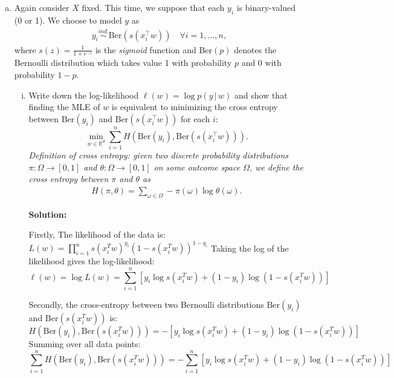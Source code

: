 \documentclass{article}
\newenvironment{solution}{\color{blue} \smallskip \textbf{Solution:}}{}
\begin{document}
\begin{enumerate}[(a)]
\begin{solution}
Thus, the MLE of \( \theta = (\theta_1, \dots, \theta_K) \) is:
\[
\boxed{\theta_k^* = \frac{n_k}{n}}
\]

 
    \end{solution}

    \newpage
    \item %
    Again consider $X$ fixed. This time, we suppose that each $y_i$ is binary-valued (0 or 1). We choose to model $y$ as 
    \begin{align*}
        y_i \stackrel{ind.}{\sim} \mathrm{Ber}(s(x_i^\top w))\quad \forall i=1,\ldots, n,
    \end{align*}
    where  $s(z) = \frac{1}{1+e^{-z}}$ is the \textit{sigmoid} function and $\mathrm{Ber}(p)$ denotes the Bernoulli distribution which takes value 1 with probability $p$ and 0 with probability $1-p$. 
    \begin{enumerate}[(i)]
        \item Write down the log-likelihood $\ell(w) = \log p(y\,|\,w)$ and show that finding the MLE of $w$ is equivalent to minimizing the cross entropy between $\mathrm{Ber}(y_i)$ and $\mathrm{Ber}(s(x_i^\top w))$ for each $i$: 
        \begin{equation}
        \label{eq:lrce}
            \min_{w\in\mathbb R^d} \sum_{i=1}^n H(\mathrm{Ber}(y_i), \mathrm{Ber}(s(x_i^\top w))).
        \end{equation}
        \textit{Definition of cross entropy: given two discrete probability distributions $\pi:\Omega\to[0,1]$ and $\theta:\Omega\to[0,1]$ on some outcome space $\Omega$, we define the cross entropy between $\pi$ and $\theta$ as}
        \begin{align*}
            H(\pi, \theta) = \sum_{\omega\in\Omega} -\pi(\omega)\log\theta(\omega).
        \end{align*}

        \begin{solution}
        
Firstly, 
The likelihood of the data is:
\(
L(w) = \prod_{i=1}^{n} s(x_i^T w)^{y_i} (1 - s(x_i^T w))^{1 - y_i}
\)
Taking the log of the likelihood gives the log-likelihood:
\[
\ell(w) = \log L(w) = \sum_{i=1}^{n} \left[ y_i \log s(x_i^T w) + (1 - y_i) \log(1 - s(x_i^T w)) \right]
\]

Secondly, the cross-entropy between two Bernoulli distributions \( \text{Ber}(y_i) \) and \( \text{Ber}(s(x_i^T w)) \) is:
\(
H(\text{Ber}(y_i), \text{Ber}(s(x_i^T w))) = - \left[ y_i \log s(x_i^T w) + (1 - y_i) \log(1 - s(x_i^T w)) \right]
\)
Summing over all data points:
\[
\sum_{i=1}^{n} H(\text{Ber}(y_i), \text{Ber}(s(x_i^T w))) = - \sum_{i=1}^{n} \left[ y_i \log s(x_i^T w) + (1 - y_i) \log(1 - s(x_i^T w)) \right]
\]


\end{solution}
\end{enumerate}
\end{enumerate}
\end{document}
